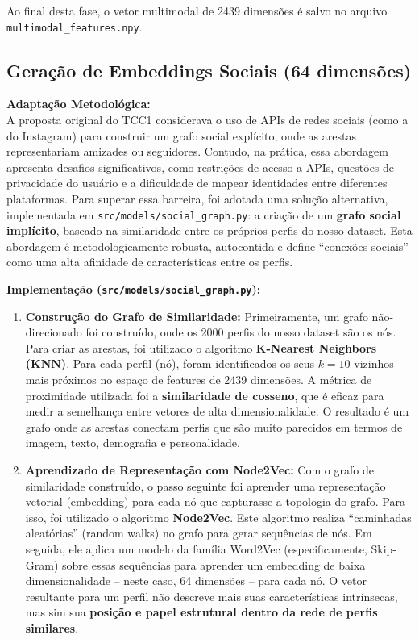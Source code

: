 Ao final desta fase, o vetor multimodal de 2439 dimensões é salvo no arquivo \texttt{multimodal\_features.npy}.

\subsection{Geração de Embeddings Sociais (64 dimensões)}
\textbf{Adaptação Metodológica:} \\
A proposta original do TCC1 considerava o uso de APIs de redes sociais (como a do Instagram) para construir um grafo social explícito, onde as arestas representariam amizades ou seguidores. Contudo, na prática, essa abordagem apresenta desafios significativos, como restrições de acesso a APIs, questões de privacidade do usuário e a dificuldade de mapear identidades entre diferentes plataformas. Para superar essa barreira, foi adotada uma solução alternativa, implementada em \texttt{src/models/social\_graph.py}: a criação de um \textbf{grafo social implícito}, baseado na similaridade entre os próprios perfis do nosso dataset. Esta abordagem é metodologicamente robusta, autocontida e define ``conexões sociais'' como uma alta afinidade de características entre os perfis.

\textbf{Implementação (\texttt{src/models/social\_graph.py}):}
\begin{enumerate}
    \item \textbf{Construção do Grafo de Similaridade:} Primeiramente, um grafo não-direcionado foi construído, onde os 2000 perfis do nosso dataset são os nós. Para criar as arestas, foi utilizado o algoritmo \textbf{K-Nearest Neighbors (KNN)}. Para cada perfil (nó), foram identificados os seus $k=10$ vizinhos mais próximos no espaço de features de 2439 dimensões. A métrica de proximidade utilizada foi a \textbf{similaridade de cosseno}, que é eficaz para medir a semelhança entre vetores de alta dimensionalidade. O resultado é um grafo onde as arestas conectam perfis que são muito parecidos em termos de imagem, texto, demografia e personalidade.

    \item \textbf{Aprendizado de Representação com Node2Vec:} Com o grafo de similaridade construído, o passo seguinte foi aprender uma representação vetorial (embedding) para cada nó que capturasse a topologia do grafo. Para isso, foi utilizado o algoritmo \textbf{Node2Vec}. Este algoritmo realiza ``caminhadas aleatórias'' (random walks) no grafo para gerar sequências de nós. Em seguida, ele aplica um modelo da família Word2Vec (especificamente, Skip-Gram) sobre essas sequências para aprender um embedding de baixa dimensionalidade – neste caso, 64 dimensões – para cada nó. O vetor resultante para um perfil não descreve mais suas características intrínsecas, mas sim sua \textbf{posição e papel estrutural dentro da rede de perfis similares}.
\end{enumerate}


